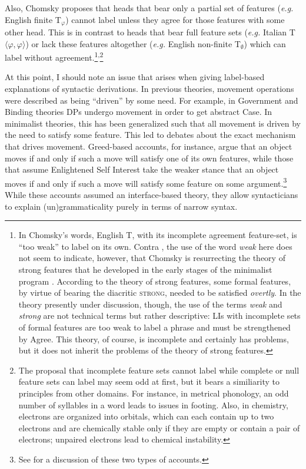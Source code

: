 Also, Chomsky proposes that heads that bear only a partial set of features (\textit{e.g.} English finite T$_\varphi$) cannot label unless they agree for those features with some other head.
This is in contrast to heads that bear full feature sets (\textit{e.g.} Italian T${\langle\varphi,\varphi\rangle}$) or lack these features altogether (\textit{e.g.} English non-finite T$_\emptyset$) which can label without agreement.\footnote{
	In Chomsky's words, English T, with its incomplete agreement feature-set, is ``too weak'' to label on its own. 
	Contra \textcite{gallego2017remark}, the use of the word \textit{weak} here does not seem to indicate, however, that Chomsky is resurrecting the theory of strong features that he developed in the early stages of the minimalist program \parencite{chomsky1995minimalist,chomsky2000minimalist}.
	According to the theory of strong features, some formal features, by virtue of bearing the diacritic \textsc{strong}, needed to be satisfied \textit{overtly}.
	In the theory presently under discussion, though, the use of the terms \textit{weak} and \textit{strong} are not technical terms but rather descriptive: 
	LIs with incomplete sets of formal features are too weak to label a phrase and must be strengthened by Agree.
	This theory, of course, is incomplete and certainly has problems, but it does not inherit the problems of the theory of strong features.
}\textsuperscript{\footnotesize ,}\footnote{
	The proposal that incomplete feature sets cannot label while complete or null feature sets can label may seem odd at first, but it bears a similiarity to principles from other domains.
	For instance, in metrical phonology, an odd number of syllables in a word leads to issues in footing.
	Also, in chemistry, electrons are organized into orbitals, which can each contain up to two electrons and are chemically stable only if they are empty or contain a pair of electrons; unpaired electrons lead to chemical instability.
}

At this point, I should note an issue that arises when giving label-based explanations of syntactic derivations.
In previous theories, movement operations were described as being ``driven'' by some need.
For example, in Government and Binding theories DPs undergo movement in order to get abstract Case.
In minimalist theories, this has been generalized such that all movement is driven by the need to satisfy some feature.
This led to debates about the exact mechanism that drives movement. 
Greed-based accounts, for instance, argue that an object moves if and only if such a move will satisfy one of its own features, while those that assume Enlightened Self Interest take the weaker stance that an object moves if and only if such a move will satisfy some feature on some argument.\footnote{
	See \textcite{lasnik1999last} for a discussion of these two types of accounts.
}
While these accounts assumed an interface-based theory, they allow syntacticians to explain (un)grammaticality purely in terms of narrow syntax.


